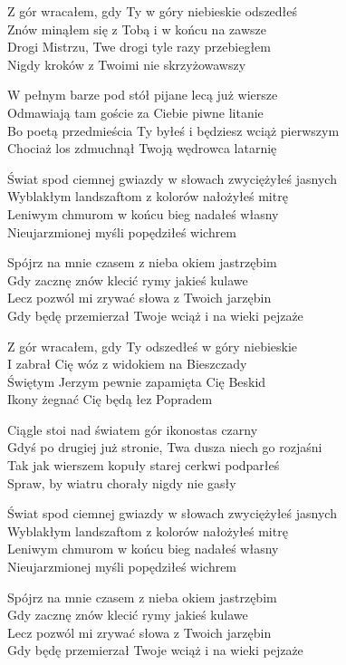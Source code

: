 \begin{textn}
Z gór wracałem, gdy Ty w góry niebieskie odszedłeś\\
Znów minąłem się z Tobą i w końcu na zawsze\\
Drogi Mistrzu, Twe drogi tyle razy przebiegłem\\
Nigdy kroków z Twoimi nie skrzyżowawszy

W pełnym barze pod stół pijane lecą już wiersze\\
Odmawiają tam goście za Ciebie piwne litanie\\
Bo poetą przedmieścia Ty byłeś i będziesz wciąż pierwszym\\
Chociaż los zdmuchnął Twoją wędrowca latarnię

Świat spod ciemnej gwiazdy w słowach zwyciężyłeś jasnych\\
Wyblakłym landszaftom z kolorów nałożyłeś mitrę\\
Leniwym chmurom w końcu bieg nadałeś własny\\
Nieujarzmionej myśli popędziłeś wichrem

Spójrz na mnie czasem z nieba okiem jastrzębim\\
Gdy zacznę znów klecić rymy jakieś kulawe\\
Lecz pozwól mi zrywać słowa z Twoich jarzębin\\
Gdy będę przemierzał Twoje wciąż i na wieki pejzaże

Z gór wracałem, gdy Ty odszedłeś w góry niebieskie\\
I zabrał Cię wóz z widokiem na Bieszczady\\
Świętym Jerzym pewnie zapamięta Cię Beskid\\
Ikony żegnać Cię będą łez Popradem

Ciągle stoi nad światem gór ikonostas czarny\\
Gdyś po drugiej już stronie, Twa dusza niech go rozjaśni\\
Tak jak wierszem kopuły starej cerkwi podparłeś\\
Spraw, by wiatru chorały nigdy nie gasły

Świat spod ciemnej gwiazdy w słowach zwyciężyłeś jasnych\\
Wyblakłym landszaftom z kolorów nałożyłeś mitrę\\
Leniwym chmurom w końcu bieg nadałeś własny\\
Nieujarzmionej myśli popędziłeś wichrem

Spójrz na mnie czasem z nieba okiem jastrzębim\\
Gdy zacznę znów klecić rymy jakieś kulawe\\
Lecz pozwól mi zrywać słowa z Twoich jarzębin\\
Gdy będę przemierzał Twoje wciąż i na wieki pejzaże
\end{textn}
